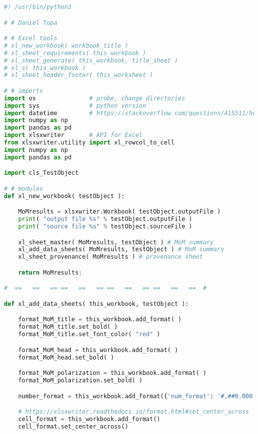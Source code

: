 % 

	{\tiny{
	\begin{lstlisting}[language=Python]
#! /usr/bin/python3

# # Daniel Topa

# # Excel tools
# xl_new_workbook( workbook_title )
# xl_sheet_requirements( this_workbook )
# xl_sheet_generate( this_workbook, title_sheet )
# xl_s( this_workbook )
# xl_sheet_header_footer( this_worksheet )

# # imports
import os               # probe, change directories
import sys              # python version
import datetime         # https://stackoverflow.com/questions/415511/how-to-get-the-current-time-in-python
import numpy as np
import pandas as pd
import xlsxwriter       # API for Excel
from xlsxwriter.utility import xl_rowcol_to_cell
import numpy as np
import pandas as pd

import cls_TestObject

# # modules
def xl_new_workbook( testObject ):

    MoMresults = xlsxwriter.Workbook( testObject.outputFile )
    print( "output file %s" % testObject.outputFile )
    print( "source file %s" % testObject.sourceFile )

    xl_sheet_master( MoMresults, testObject ) # MoM summary
    xl_add_data_sheets( MoMresults, testObject ) # MoM summary
    xl_sheet_provenance( MoMresults ) # provenance sheet

    return MoMresults;

#  ==   ==   == ==   ==   == ==   ==   == ==   ==   ==  #

def xl_add_data_sheets( this_workbook, testObject ):

    format_MoM_title = this_workbook.add_format( )
    format_MoM_title.set_bold( )
    format_MoM_title.set_font_color( "red" )

    format_MoM_head = this_workbook.add_format( )
    format_MoM_head.set_bold( )

    format_MoM_polarization = this_workbook.add_format( )
    format_MoM_polarization.set_bold( )

    number_format = this_workbook.add_format({'num_format': '#,##0.000'})

    # https://xlsxwriter.readthedocs.io/format.html#set_center_across
    cell_format = this_workbook.add_format()
    cell_format.set_center_across()


\end{lstlisting}}}
